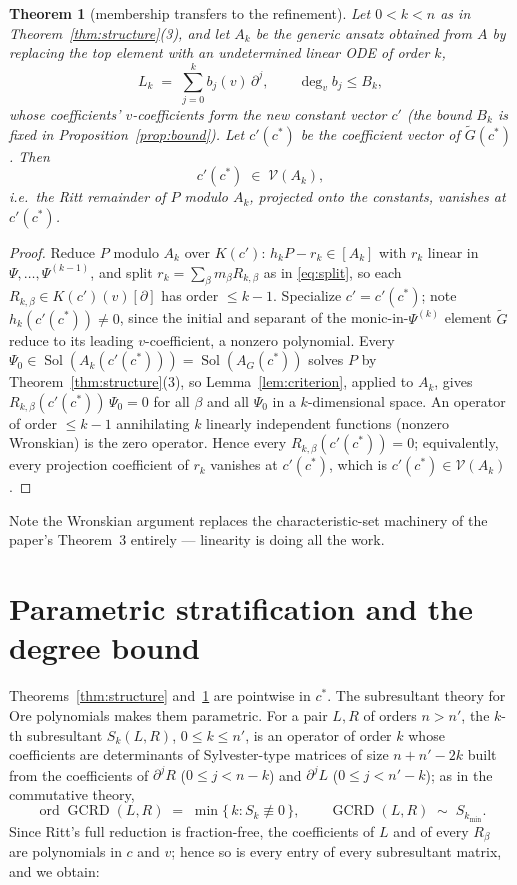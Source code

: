 \documentclass[11pt]{article}
\newcommand{\Var}{\mathcal{V}}
\DeclareMathOperator{\Sol}{Sol}
\DeclareMathOperator{\GCRD}{GCRD}
\DeclareMathOperator{\ord}{ord}
\newtheorem{theorem}{Theorem}
\begin{document}
\begin{theorem}[membership transfers to the refinement]
\label{thm:membership}
Let $0 < k < n$ as in Theorem~\ref{thm:structure}(3), and let $A_k$ be the
\emph{generic} ansatz obtained from $A$ by replacing the top element with an
undetermined linear ODE of order $k$,
\[
L_k \;=\; \sum_{j=0}^{k} b_j(v)\,\partial^j,
\qquad \deg_v b_j \le B_k,
\]
whose coefficients' $v$-coefficients form the new constant vector $c'$
(the bound $B_k$ is fixed in Proposition~\ref{prop:bound}). Let
$c'(c^*)$ be the coefficient vector of $\widetilde{G}(c^*)$. Then
\[
c'(c^*) \;\in\; \Var(A_k),
\]
i.e.\ the Ritt remainder of $P$ modulo $A_k$, projected onto the constants,
vanishes at $c'(c^*)$.
\end{theorem}

\begin{proof}
Reduce $P$ modulo $A_k$ over $K(c')$: $h_k P - r_k \in [A_k]$ with $r_k$
linear in $\Psi, \dots, \Psi^{(k-1)}$, and split
$r_k = \sum_\beta m_\beta R_{k,\beta}$ as in \eqref{eq:split}, so each
$R_{k,\beta} \in K(c')(v)[\partial]$ has order $\le k - 1$. Specialize
$c' = c'(c^*)$; note $h_k(c'(c^*)) \neq 0$, since the initial and separant of
the monic-in-$\Psi^{(k)}$ element $\widetilde{G}$ reduce to its leading
$v$-coefficient, a nonzero polynomial. Every
$\Psi_0 \in \Sol(A_k(c'(c^*))) = \Sol(A_G(c^*))$ solves $P$ by
Theorem~\ref{thm:structure}(3), so Lemma~\ref{lem:criterion}, applied to
$A_k$, gives $R_{k,\beta}(c'(c^*))\,\Psi_0 = 0$ for all $\beta$ and all
$\Psi_0$ in a $k$-dimensional space. An operator of order $\le k - 1$
annihilating $k$ linearly independent functions (nonzero Wronskian) is the
zero operator. Hence every $R_{k,\beta}(c'(c^*)) = 0$; equivalently, every
projection coefficient of $r_k$ vanishes at $c'(c^*)$, which is
$c'(c^*) \in \Var(A_k)$.
\end{proof}

Note the Wronskian argument replaces the characteristic-set machinery of the
paper's Theorem~3 entirely --- linearity is doing all the work.

\section{Parametric stratification and the degree bound}
\label{sec:subresultants}

Theorems~\ref{thm:structure} and~\ref{thm:membership} are pointwise in
$c^*$. The subresultant theory for Ore polynomials \cite{chardin,li} makes
them parametric. For a pair $L, R$ of orders $n > n'$, the $k$-th
subresultant $S_k(L, R)$, $0 \le k \le n'$, is an operator of order $k$
whose coefficients are determinants of Sylvester-type matrices of size
$n + n' - 2k$ built from the coefficients of
$\partial^j R$ ($0 \le j < n - k$) and $\partial^j L$ ($0 \le j < n' - k$);
as in the commutative theory,
\[
\ord \GCRD(L, R) \;=\; \min\{\,k : S_k \not\equiv 0\,\},
\qquad
\GCRD(L, R) \;\sim\; S_{k_{\min}} .
\]
Since Ritt's full reduction is fraction-free, the coefficients of $L$ and of
every $R_\beta$ are polynomials in $c$ and $v$; hence so is every entry of
every subresultant matrix, and we obtain:
\end{document}
